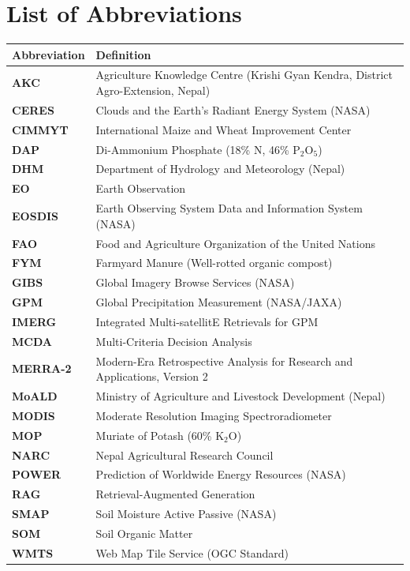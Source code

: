 \documentclass[11pt,a4paper]{report}
\begin{document}
\tableofcontents
\listoffigures
\listoftables

\chapter*{List of Abbreviations}
\begin{tabularx}{\textwidth}{lX}
\toprule
\textbf{Abbreviation} & \textbf{Definition} \\
\midrule
\textbf{AKC} & Agriculture Knowledge Centre (Krishi Gyan Kendra, District Agro-Extension, Nepal) \\
\textbf{CERES} & Clouds and the Earth's Radiant Energy System (NASA) \\
\textbf{CIMMYT} & International Maize and Wheat Improvement Center \\
\textbf{DAP} & Di-Ammonium Phosphate (18\% N, 46\% P$_2$O$_5$) \\
\textbf{DHM} & Department of Hydrology and Meteorology (Nepal) \\
\textbf{EO} & Earth Observation \\
\textbf{EOSDIS} & Earth Observing System Data and Information System (NASA) \\
\textbf{FAO} & Food and Agriculture Organization of the United Nations \\
\textbf{FYM} & Farmyard Manure (Well-rotted organic compost) \\
\textbf{GIBS} & Global Imagery Browse Services (NASA) \\
\textbf{GPM} & Global Precipitation Measurement (NASA/JAXA) \\
\textbf{IMERG} & Integrated Multi-satellitE Retrievals for GPM \\
\textbf{MCDA} & Multi-Criteria Decision Analysis \\
\textbf{MERRA-2} & Modern-Era Retrospective Analysis for Research and Applications, Version 2 \\
\textbf{MoALD} & Ministry of Agriculture and Livestock Development (Nepal) \\
\textbf{MODIS} & Moderate Resolution Imaging Spectroradiometer \\
\textbf{MOP} & Muriate of Potash (60\% K$_2$O) \\
\textbf{NARC} & Nepal Agricultural Research Council \\
\textbf{POWER} & Prediction of Worldwide Energy Resources (NASA) \\
\textbf{RAG} & Retrieval-Augmented Generation \\
\textbf{SMAP} & Soil Moisture Active Passive (NASA) \\
\textbf{SOM} & Soil Organic Matter \\
\textbf{WMTS} & Web Map Tile Service (OGC Standard) \\
\bottomrule
\end{tabularx}
\end{document}
